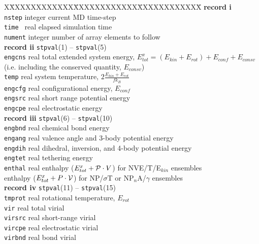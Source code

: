 \begin{tabbing}
X\=XXXXXXXXXXXX\=XXXXXXXXXXXX\=XXXXXXXXXXXX\=\kill
{\bf record i} \\
\> {\tt nstep}  \> integer \> current MD time-step \\
\> {\tt time }  \> real    \> elapsed simulation time \\
\> {\tt nument} \> integer \> number of array elements to follow \\
{\bf record ii} {\tt stpval}(1) -- {\tt stpval}(5) \\
\> {\tt engcns} \> real    \> total extended system energy, $E^{x}_{tot}=(E_{kin}+E_{rot})+E_{conf}+E_{consv}$ \\
\>              \>         \> (i.e. including the conserved quantity, $E_{consv}$) \\
\> {\tt temp}   \> real    \> system temperature, $2\frac{E_{kin}+E_{rot}}{f k_{B}}$ \\
\> {\tt engcfg} \> real    \> configurational energy, $E_{conf}$ \\
\> {\tt engsrc} \> real    \> short range potential energy \\
\> {\tt engcpe} \> real    \> electrostatic energy \\
{\bf record iii} {\tt stpval}(6) -- {\tt stpval}(10) \\
\> {\tt engbnd} \> real    \> chemical bond energy \\
\> {\tt engang} \> real    \> valence angle and 3-body potential energy \\
\> {\tt engdih} \> real    \> dihedral, inversion, and 4-body potential energy \\
\> {\tt engtet} \> real    \> tethering energy \\
\> {\tt enthal} \> real    \> enthalpy ($E^{x}_{tot} + {\cal P} \cdot V$) for NVE/T/E$_{kin}$ ensembles \\
\>              \>         \> enthalpy ($E^{x}_{tot} + P \cdot {\cal V}$) for NP/$\sigma$T or NP$_{n}$A/$\gamma$ ensembles \\
{\bf record iv} {\tt stpval}(11) -- {\tt stpval}(15) \\
\> {\tt tmprot} \> real    \> rotational temperature, $E_{rot}$ \\
\> {\tt vir}    \> real    \> total virial \\
\> {\tt virsrc} \> real    \> short-range virial \\
\> {\tt vircpe} \> real    \> electrostatic virial \\
\> {\tt virbnd} \> real    \> bond virial \\

\end{tabbing}
